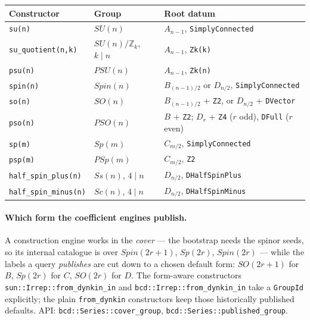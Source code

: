 \documentclass[11pt,a4paper]{article}
\theoremstyle{plain}
\theoremstyle{definition}
\newcommand{\ZZ}{\mathbb{Z}}
\newcommand{\code}[1]{\texttt{#1}}
\begin{document}
\begin{center}
\small
\begin{tabular}{@{}lll@{}}
\toprule
Constructor & Group & Root datum \\
\midrule
\code{su(n)}              & $SU(n)$        & $A_{n-1}$, \code{SimplyConnected} \\
\code{su\_quotient(n,k)}  & $SU(n)/\ZZ_k$, $k\mid n$ & $A_{n-1}$, \code{Zk(k)} \\
\code{psu(n)}             & $PSU(n)$       & $A_{n-1}$, \code{Zk(n)} \\
\code{spin(n)}            & $Spin(n)$      & $B_{(n-1)/2}$ or $D_{n/2}$, \code{SimplyConnected} \\
\code{so(n)}              & $SO(n)$        & $B_{(n-1)/2}$ + \code{Z2}, or $D_{n/2}$ + \code{DVector} \\
\code{pso(n)}             & $PSO(n)$       & $B$ + \code{Z2}; $D_r$ + \code{Z4} ($r$ odd), \code{DFull} ($r$ even) \\
\code{sp(m)}              & $Sp(m)$        & $C_{m/2}$, \code{SimplyConnected} \\
\code{psp(m)}              & $PSp(m)$       & $C_{m/2}$, \code{Z2} \\
\code{half\_spin\_plus(n)}  & $Ss(n)$, $4\mid n$ & $D_{n/2}$, \code{DHalfSpinPlus} \\
\code{half\_spin\_minus(n)} & $Sc(n)$, $4\mid n$ & $D_{n/2}$, \code{DHalfSpinMinus} \\
\bottomrule
\end{tabular}
\end{center}

\begin{sloppypar}
\paragraph{Which form the coefficient engines publish.} A construction engine
works in the \emph{cover} --- the bootstrap needs the spinor seeds, so its
internal catalogue is over $Spin(2r+1)$, $Sp(2r)$, $Spin(2r)$ --- while the
labels a query \emph{publishes} are cut down to a chosen default form:
$SO(2r+1)$ for $B$, $Sp(2r)$ for $C$, $SO(2r)$ for $D$. The form-aware
constructors \code{sun::Irrep::from\_dynkin\_in} and
\code{bcd::Irrep::from\_dynkin\_in} take a \code{GroupId} explicitly; the plain
\code{from\_dynkin} constructors keep those historically published defaults.
API: \code{bcd::Series::cover\_group}, \code{bcd::Series::published\_group}.
\end{sloppypar}
\end{document}
